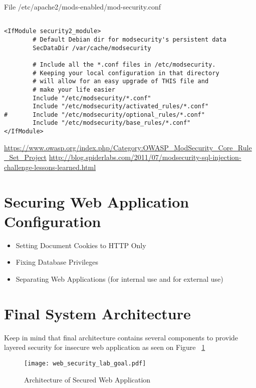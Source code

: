 File /etc/apache2/mods-enabled/mod-security.conf
\begin{verbatim}

<IfModule security2_module>
        # Default Debian dir for modsecurity's persistent data
        SecDataDir /var/cache/modsecurity
 
        # Include all the *.conf files in /etc/modsecurity.
        # Keeping your local configuration in that directory
        # will allow for an easy upgrade of THIS file and
        # make your life easier
        Include "/etc/modsecurity/*.conf"
        Include "/etc/modsecurity/activated_rules/*.conf"
#       Include "/etc/modsecurity/optional_rules/*.conf"
        Include "/etc/modsecurity/base_rules/*.conf"
</IfModule>
\end{verbatim} 

\url{https://www.owasp.org/index.php/Category:OWASP_ModSecurity_Core_Rule_Set_Project}
\url{http://blog.spiderlabs.com/2011/07/modsecurity-sql-injection-challenge-lessons-learned.html}




\section{Securing Web Application Configuration}
\begin{itemize}
\item Setting Document Cookies to HTTP Only
\item Fixing Database Privileges
\item Separating Web Applications (for internal use and for external use)
\end{itemize}

\section{Final System Architecture} 
Keep in mind that final architecture contains several components to provide layered security for insecure web application as seen on Figure ~\ref{Architecture of Secured Web Application}

\begin{figure}[H] 
 \centering 
 \texttt{[image: web\_security\_lab\_goal.pdf]} 
 \caption{Architecture of Secured Web Application} 
 \label{Architecture of Secured Web Application} 
\end{figure}


